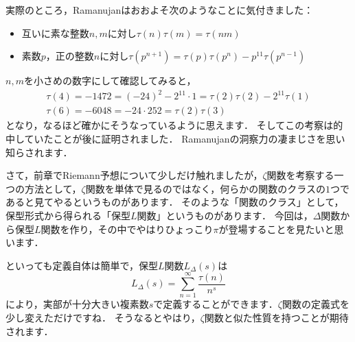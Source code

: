 実際のところ，Ramanujanはおおよそ次のようなことに気付きました：
\begin{itemize}
	\item 互いに素な整数$n,m$に対し$\tau(n)\tau(m)=\tau(nm)$
	\item 素数$p$，正の整数$n$に対し$\tau(p^{n+1})=\tau(p) \tau(p^{n})-p^{11}\tau(p^{n-1})$
\end{itemize}
$n,m$を小さめの数字にして確認してみると，
\begin{gather*}
	\tau(4)=-1472=(-24)^2-2^{11} \cdot 1=\tau(2)\tau(2)-2^{11}\tau(1) \\
	\tau(6)=-6048=-24 \cdot 252 = \tau(2) \tau(3)
\end{gather*}
となり，なるほど確かにそうなっているように思えます．
そしてこの考察は的中していたことが後に証明されました．
Ramanujanの洞察力の凄まじさを思い知らされます．

さて，前章でRiemann予想について少しだけ触れましたが，$\zeta$関数を考察する一つの方法として，$\zeta$関数を単体で見るのではなく，何らかの関数のクラスの$1$つであると見てやるというものがあります．
そのような「関数のクラス」として，保型形式から得られる「保型$L$関数」というものがあります．
今回は，$\Delta$関数から保型$L$関数を作り，その中でやはりひょっこり$\pi$が登場することを見たいと思います．

といっても定義自体は簡単で，保型$L$関数$L_{\Delta}(s)$は
\[
	L_{\Delta}(s)=\sum_{n=1}^{\infty}\frac {\tau (n)}{n^s}
\]
により，実部が十分大きい複素数$s$で定義することができます．$\zeta$関数の定義式を少し変えただけですね．
そうなるとやはり，$\zeta$関数と似た性質を持つことが期待されます．

